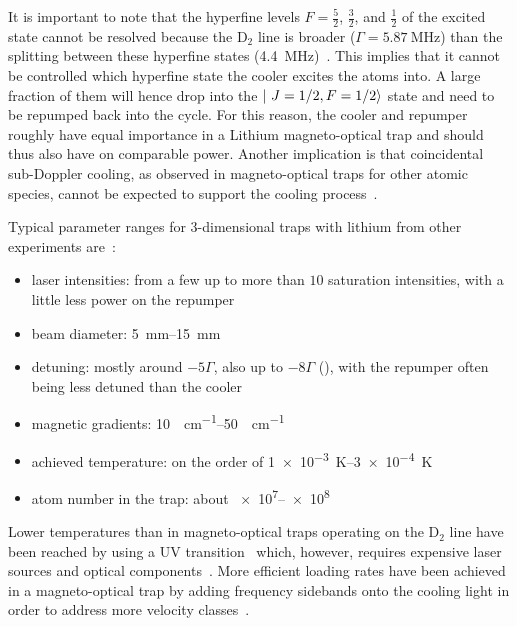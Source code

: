 It is important to note that the hyperfine levels $F = \frac{5}{2}$, $\frac{3}{2}$, and $\frac{1}{2}$ of the excited state cannot be resolved because the D$_2$ line is broader ($\Gamma = \SI[]{5.87}{\mega\hertz}$) than the splitting between these hyperfine states (\SI[]{4.4}{\mega\hertz})~\cite{gehm_properties_2003}. This implies that it cannot be controlled which hyperfine state the cooler excites the atoms into. A large fraction of them will hence drop into the $\Ket{~J=1/2, F=1/2}$ state and need to be repumped back into the cycle. For this reason, the cooler and repumper roughly have equal importance in a Lithium magneto-optical trap and should thus also have on comparable power. Another implication is that coincidental sub-Doppler cooling, as observed in magneto-optical traps for other atomic species, cannot be expected to support the cooling process~\cite{grier_lambda-enhanced_2013}.

Typical parameter ranges for 3-dimensional traps with lithium from other experiments are~\cite{
    tiecke_high-flux_2009,
    kawanaka_decay_1993,
    schunemann_magneto-optic_1998,
    mewes_simultaneous_1999,
    hilker_laser_2012,
    kerkmann_novel_2019,
    ladouceur_compact_2009,
    chen_lithium-cesium_2021,    
    burchianti_efficient_2014,
    li_enhanced_2015,
}:
\begin{itemize}
    \item laser intensities: from a few up to more than $10$ saturation intensities, with a little less power on the repumper
    \item beam diameter: \SIrange{5}{15}{\milli\meter}
    \item detuning: mostly around $-5\Gamma$, also up to $-8 \Gamma$ (\cite{li_enhanced_2015}), with the repumper often being less detuned than the cooler
    \item magnetic gradients: \SIrange{10}{50}{\gauss\per\centi\meter}
    \item achieved temperature: on the order of \SIrange{1e-3}{3e-4}{\kelvin}
    \item atom number in the trap: about \SIrange{e7}{e8}{}
\end{itemize}

Lower temperatures than in magneto-optical traps operating on the D$_2$ line have been reached by using a UV transition~\cite{duarte_all-optical_2011,omran_microscopic_2015} which, however, requires expensive laser sources and optical components~\cite{burchianti_efficient_2014}. More efficient loading rates have been achieved in a magneto-optical trap by adding frequency sidebands onto the cooling light in order to address more velocity classes~\cite{li_enhanced_2015}.

